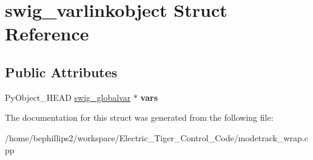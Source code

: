 \hypertarget{structswig__varlinkobject}{\section{swig\-\_\-varlinkobject Struct Reference}
\label{structswig__varlinkobject}
}
\subsection*{Public Attributes}
\begin{DoxyCompactItemize}
\item 
\hypertarget{structswig__varlinkobject_a8cf96d999cdf0b28a0e90ccb6804c9bd}{Py\-Object\-\_\-\-H\-E\-A\-D \hyperlink{structswig__globalvar}{swig\-\_\-globalvar} $\ast$ {\bfseries vars}}\label{structswig__varlinkobject_a8cf96d999cdf0b28a0e90ccb6804c9bd}

\end{DoxyCompactItemize}


The documentation for this struct was generated from the following file\-:\begin{DoxyCompactItemize}
\item 
/home/bephillips2/workspace/\-Electric\-\_\-\-Tiger\-\_\-\-Control\-\_\-\-Code/modetrack\-\_\-wrap.\-cpp\end{DoxyCompactItemize}
